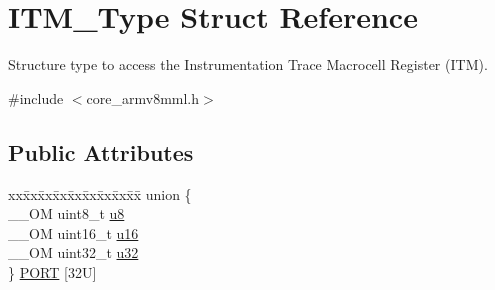 \hypertarget{struct_i_t_m___type}{}\section{I\+T\+M\+\_\+\+Type Struct Reference}
\label{struct_i_t_m___type}


Structure type to access the Instrumentation Trace Macrocell Register (I\+TM).  




{\ttfamily \#include $<$core\+\_\+armv8mml.\+h$>$}

\subsection*{Public Attributes}
\begin{DoxyCompactItemize}
\item 
\begin{tabbing}
xx\=xx\=xx\=xx\=xx\=xx\=xx\=xx\=xx\=\kill
union \{\\
\>\_\_OM uint8\_t \mbox{\hyperlink{struct_i_t_m___type_ae773bf9f9dac64e6c28b14aa39f74275}{u8}}\\
\>\_\_OM uint16\_t \mbox{\hyperlink{struct_i_t_m___type_a962a970dfd286cad7f8a8577e87d4ad3}{u16}}\\
\>\_\_OM uint32\_t \mbox{\hyperlink{struct_i_t_m___type_a5834885903a557674f078f3b71fa8bc8}{u32}}\\
\} \mbox{\hyperlink{struct_i_t_m___type_a7010d53d9f2b725fba177015cbdc6bc2}{PORT}} \mbox{[}32U\mbox{]}\\


\end{tabbing}
\end{DoxyCompactItemize}
